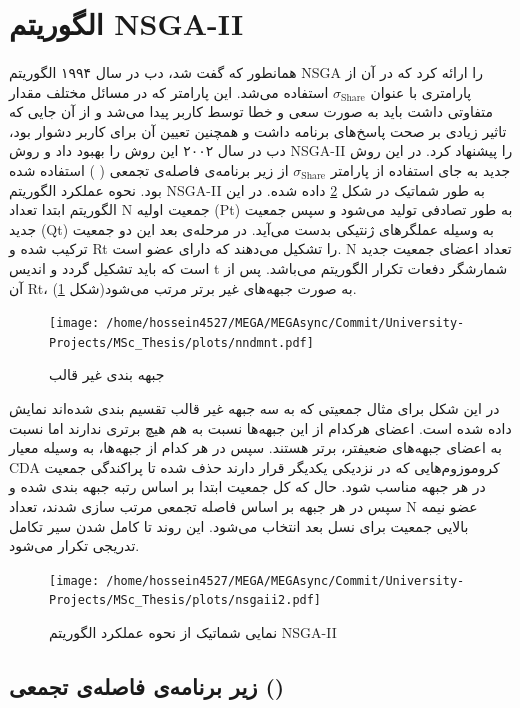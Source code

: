 \documentclass[a4paper,titlepage,12pt,fleqn,oneside]{report}
\begin{document}
	\section{الگوریتم NSGA-II}
	\paragraph{}
	همانطور که گفت شد، دب در سال ۱۹۹۴ الگوریتم NSGA را ارائه کرد که در آن از پارامتری با عنوان $\sigma_{\text {Share}}$ استفاده می‌شد. این پارامتر که در مسائل مختلف مقدار متفاوتی داشت باید به صورت سعی و خطا توسط کاربر پیدا می‌شد و از آن جایی که تاثیر زیادی بر صحت پاسخ‌های برنامه داشت و همچنین تعیین آن برای کاربر دشوار بود، دب در سال ۲۰۰۲ این روش را بهبود داد و روش NSGA-II را پیشنهاد کرد. در این روش جدید به جای استفاده از پارامتر $\sigma_{\text {Share}}$ از زیر برنامه‌ی فاصله‌ی تجمعی (%
	) استفاده شده بود. نحوه عملکرد الگوریتم NSGA-II به طور شماتیک در شکل \ref{fig:nsgaii} داده شده. در این الگوریتم ابتدا تعداد N جمعیت اولیه (Pt) به طور تصادفی تولید می‌شود و سپس جمعیت جدید (Qt) به وسیله عملگر‌های ژنتیکی بدست می‌آید. در مرحله‌ی بعد این دو جمعیت ترکیب شده و Rt را تشکیل می‌دهند که دارای  عضو است. N تعداد اعضای جمعیت جدید است که باید تشکیل گردد و اندیس t شمارشگر دفعات تکرار الگوریتم می‌باشد. پس از آن Rt، به صورت جبهه‌های غیر برتر مرتب می‌شود(شکل \ref{fig:nndmnt}).
	\begin{figure}[ht!]
		\centering
		\texttt{[image: /home/hossein4527/MEGA/MEGAsync/Commit/University-Projects/MSc\_Thesis/plots/nndmnt.pdf]}
		\caption{جبهه بندی غیر قالب}
		\label{fig:nndmnt}
	\end{figure}
	در این شکل برای مثال جمعیتی که به سه جبهه غیر قالب تقسیم بندی شده‌اند نمایش داده شده است. اعضای هرکدام از این جبهه‌ها نسبت به هم هیچ برتری ندارند اما نسبت به اعضای جبهه‌های ضعیفتر، برتر هستند. سپس در هر کدام از جبهه‌ها، به وسیله معیار CDA کروموزوم‌هایی که در نزدیکی یکدیگر قرار دارند حذف شده تا پراکندگی جمعیت در هر جبهه مناسب شود. حال که کل جمعیت ابتدا بر اساس رتبه جبهه بندی شده و سپس در هر جبهه بر اساس فاصله تجمعی مرتب سازی شدند، تعداد N عضو نیمه بالایی جمعیت برای نسل بعد انتخاب می‌شود. این روند تا کامل شدن سیر تکامل تدریجی تکرار می‌شود.
	\begin{figure}[hb!]
		\centering
		\texttt{[image: /home/hossein4527/MEGA/MEGAsync/Commit/University-Projects/MSc\_Thesis/plots/nsgaii2.pdf]}
		\caption{نمایی شماتيک از نحوه عملکرد الگوريتم NSGA-II}
		\label{fig:nsgaii}
	\end{figure}
	\subsection{زیر برنامه‌ی فاصله‌ی تجمعی ()}
\end{document}
